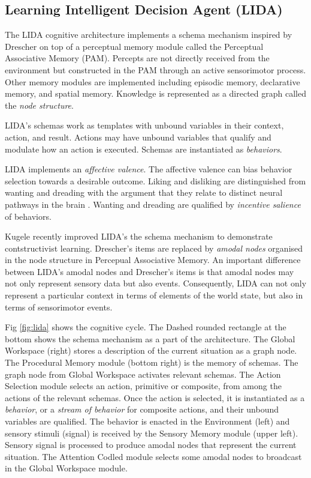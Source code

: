 \documentclass[runningheads]{llncs}
\begin{document}
\subsection{Learning Intelligent Decision Agent (LIDA)}
\label{sec:lida}

The LIDA cognitive architecture \cite{kugele_learning_2021}  implements a schema mechanism inspired by Drescher on top of a perceptual memory module called the Perceptual Associative Memory (PAM). 
Percepts are not directly received from the environment but constructed in the PAM through an active sensorimotor process. 
Other memory modules are implemented including episodic memory, declarative memory, and spatial memory.
Knowledge is represented as a directed graph called the \textit{node structure}. 

LIDA's schemas work as templates with unbound variables in their context, action, and result. 
Actions may have  unbound variables that qualify and modulate how an action is executed. 
Schemas are instantiated as \textit{behaviors}. 

LIDA implements an \textit{affective valence}. 
The affective valence can bias behavior selection towards a desirable outcome. 
Liking and disliking are distinguished from wanting and dreading with the argument that they relate to distinct neural pathways in the brain \cite{kringelbach_functional_2010}. 
Wanting and dreading are qualified by \textit{incentive salience} of behaviors.   

Kugele \cite{kugele2025_constructivist} recently improved LIDA's the schema mechanism to demonstrate contstructivist learning.
Drescher's items are replaced by \textit{amodal nodes} organised in the node structure in Percepual Associative Memory. 
An important difference between LIDA's amodal nodes and Drescher's items is that amodal nodes may not only represent sensory data but also events. 
Consequently, LIDA can not only represent a particular context in terms of elements of the world state, but also in terms of sensorimotor events. 

Fig \ref{fig:lida} shows the cognitive cycle. 
The Dashed rounded rectangle at the bottom shows the schema mechanism as a part of the architecture. 
The Global Workspace (right) stores a description of the current situation as a graph node. 
The Procedural Memory module (bottom right) is the memory of schemas. 
The graph node from Global Workspace activates relevant schemas. 
The Action Selection module selects an action, primitive or composite, from among the actions of the relevant schemas. 
Once the action is selected, it is instantiated as a \textit{behavior}, or a \textit{stream of behavior} for composite actions, and their unbound variables are qualified. 
The behavior is enacted in the Environment (left) and sensory stimuli (signal) is received by the Sensory Memory module (upper left).
Sensory signal is processed to produce amodal nodes that represent the current situation. 
The Attention Codled module selects some amodal nodes to broadcast in the Global Workspace module. 
\end{document}
